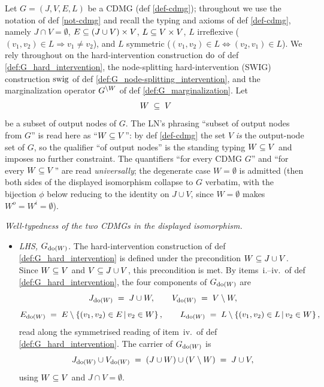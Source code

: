 \documentclass[main]{subfiles}
\begin{document}
\def\rowref{claim\_3\_19}
\label{claim_3_19}

\begin{Lem}\label{marginalizing-out-the-output-part-of-splitted-nodes-equals-hard-intervention}
    Let $G = (J, V, E, L)$ be a CDMG (def \ref{def-cdmg}); throughout we use the notation of def \ref{not-cdmg} and recall the typing and axioms of def \ref{def-cdmg}, namely $J \cap V = \emptyset$, $E \subseteq (J \cup V) \times V$, $L \subseteq V \times V$, $L$ irreflexive ($(v_1, v_2) \in L \Rightarrow v_1 \neq v_2$), and $L$ symmetric ($(v_1, v_2) \in L \Leftrightarrow (v_2, v_1) \in L$). We rely throughout on the hard-intervention construction $\operatorname{do}$ of def \ref{def:G_hard_intervention}, the node-splitting hard-intervention (SWIG) construction $\mathrm{swig}$ of def \ref{def:G_node-splitting_intervention}, and the marginalization operator $G^{\setminus W}$ of def \ref{def:G_marginalization}. Let
    \[
        W \;\subseteq\; V
    \]
    be a subset of output nodes of $G$. The LN's phrasing ``subset of output nodes from $G$'' is read here as ``$W \subseteq V$'': by def \ref{def-cdmg} the set $V$ \emph{is} the output-node set of $G$, so the qualifier ``of output nodes'' is the standing typing $W \subseteq V$ and imposes no further constraint. The quantifiers ``for every CDMG $G$'' and ``for every $W \subseteq V$'' are read \emph{universally}; the degenerate case $W = \emptyset$ is admitted (then both sides of the displayed isomorphism collapse to $G$ verbatim, with the bijection $\phi$ below reducing to the identity on $J \cup V$, since $W = \emptyset$ makes $W^o = W^i = \emptyset$).

    \emph{Well-typedness of the two CDMGs in the displayed isomorphism.}
    \begin{itemize}
        \item \emph{LHS, $G_{\operatorname{do}(W)}$.}
              The hard-intervention construction of def \ref{def:G_hard_intervention} is defined under the precondition $W \subseteq J \cup V$. Since $W \subseteq V$ and $V \subseteq J \cup V$, this precondition is met. By items~i.--iv.\ of def \ref{def:G_hard_intervention}, the four components of $G_{\operatorname{do}(W)}$ are
              \[
                  J_{\operatorname{do}(W)} \;=\; J \cup W,
                  \qquad
                  V_{\operatorname{do}(W)} \;=\; V \setminus W,
              \]
              \[
                  E_{\operatorname{do}(W)} \;=\; E \setminus \left \{ (v_1, v_2) \in E \,\middle|\, v_2 \in W \right \},
                  \qquad
                  L_{\operatorname{do}(W)} \;=\; L \setminus \left \{ (v_1, v_2) \in L \,\middle|\, v_2 \in W \right \},
              \]
              read along the symmetrised reading of item~iv.\ of def \ref{def:G_hard_intervention}. The carrier of $G_{\operatorname{do}(W)}$ is
              \[
                  J_{\operatorname{do}(W)} \cup V_{\operatorname{do}(W)} \;=\; (J \cup W) \cup (V \setminus W) \;=\; J \cup V,
              \]
              using $W \subseteq V$ and $J \cap V = \emptyset$.


\end{itemize}
\end{Lem}
\end{document}
